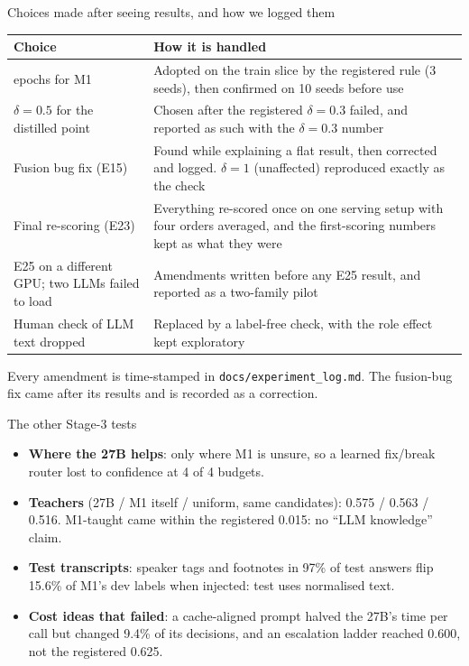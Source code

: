 \begin{frame}{Choices made after seeing results, and how we logged them}
  \footnotesize
  \renewcommand{\arraystretch}{1.2}
  \begin{tabular}{@{}>{\raggedright\arraybackslash}p{}>{\raggedright\arraybackslash}p{}@{}}
    \toprule
    Choice & How it is handled \\
    \midrule
    12 epochs for M1 & Adopted on the train slice by the registered rule (3 seeds), then confirmed on 10 seeds before use \\
    $\delta = 0.5$ for the distilled point & Chosen after the registered $\delta = 0.3$ failed, and reported as such with the $\delta = 0.3$ number \\
    Fusion bug fix (E15) & Found while explaining a flat result, then corrected and logged. $\delta = 1$ (unaffected) reproduced exactly as the check \\
    Final re-scoring (E23) & Everything re-scored once on one serving setup with four orders averaged, and the first-scoring numbers kept as what they were \\
    E25 on a different GPU; two LLMs failed to load & Amendments written before any E25 result, and reported as a two-family pilot \\
    Human check of LLM text dropped & Replaced by a label-free check, with the role effect kept exploratory \\
    \bottomrule
  \end{tabular}
  \vspace{1mm}

  Every amendment is time-stamped in \texttt{docs/experiment\_log.md}. The fusion-bug fix came after its results and is recorded as a correction.
\end{frame}

\begin{frame}{The other Stage-3 tests}
  \raggedright\small
  \begin{itemize}\setlength{\itemsep}{0.8mm}
    \item \textbf{Where the 27B helps}: only where M1 is unsure, so a learned fix/break router lost to confidence at 4 of 4 budgets.
    \item \textbf{Teachers} (27B / M1 itself / uniform, same candidates): 0.575 / 0.563 / 0.516. M1-taught came within the registered 0.015: no ``LLM knowledge'' claim.
    \item \textbf{Test transcripts}: speaker tags and footnotes in 97\% of test answers flip 15.6\% of M1's dev labels when injected: test uses normalised text.
    \item \textbf{Cost ideas that failed}: a cache-aligned prompt halved the 27B's time per call but changed 9.4\% of its decisions, and an escalation ladder reached 0.600, not the registered 0.625.
  \end{itemize}
\end{frame}

